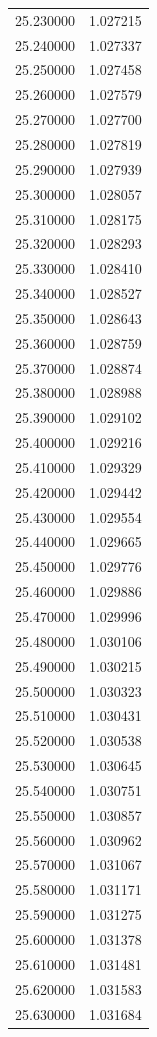 \begin{tabular}{rr}
25.230000 & 1.027215 \\
25.240000 & 1.027337 \\
25.250000 & 1.027458 \\
25.260000 & 1.027579 \\
25.270000 & 1.027700 \\
25.280000 & 1.027819 \\
25.290000 & 1.027939 \\
25.300000 & 1.028057 \\
25.310000 & 1.028175 \\
25.320000 & 1.028293 \\
25.330000 & 1.028410 \\
25.340000 & 1.028527 \\
25.350000 & 1.028643 \\
25.360000 & 1.028759 \\
25.370000 & 1.028874 \\
25.380000 & 1.028988 \\
25.390000 & 1.029102 \\
25.400000 & 1.029216 \\
25.410000 & 1.029329 \\
25.420000 & 1.029442 \\
25.430000 & 1.029554 \\
25.440000 & 1.029665 \\
25.450000 & 1.029776 \\
25.460000 & 1.029886 \\
25.470000 & 1.029996 \\
25.480000 & 1.030106 \\
25.490000 & 1.030215 \\
25.500000 & 1.030323 \\
25.510000 & 1.030431 \\
25.520000 & 1.030538 \\
25.530000 & 1.030645 \\
25.540000 & 1.030751 \\
25.550000 & 1.030857 \\
25.560000 & 1.030962 \\
25.570000 & 1.031067 \\
25.580000 & 1.031171 \\
25.590000 & 1.031275 \\
25.600000 & 1.031378 \\
25.610000 & 1.031481 \\
25.620000 & 1.031583 \\
25.630000 & 1.031684 \\

\end{tabular}
